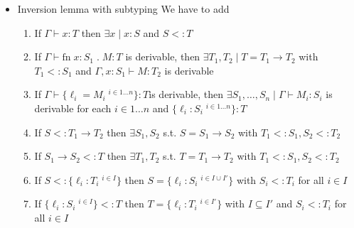 \documentclass[11pt]{article}
\newcommand{\fn}[2]{\ensuremath{\text{fn}\; #1 \; . \; #2}}
\newcommand{\type}[2]{\ensuremath{ #1 : #2 }}
\newcommand{\rec}[1]{\ensuremath{ \{ #1 \} }}
\newcommand{\subt}[2]{\ensuremath{ #1 <: #2 }}
\begin{document}
\begin{itemize}
\item Inversion lemma with subtyping
\label{sec:org315bd31}
We have to add
\begin{enumerate}
\item If \(\Gamma \vdash \type{x}{T}\) then \(\exists x \mid
        \type{x}{S}\) and \(\subt{S}{T}\)
\item If \(\Gamma\vdash\type{\fn{\type{x}{S_1}}{M}}{T}\) is
derivable, then \(\exists T_1, T_2 \mid T = T_1 \to T_2\) with
\(\subt{T_1}{S_1}\) and \(\Gamma,\type{x}{S_1}\vdash
        \type{M}{T_2}\) is derivable
\item If \(\Gamma\vdash\type{\rec{\ell_i = M_i \;^{i\in 1\dots
        n}}}{T}\)is derivable, then \(\exists S_1,\dots,S_n \mid
        \Gamma\vdash \type{M_i}{S_i}\) is derivable for each \(i\in
        1\dots n\) and \(\type{\rec{\type{\ell_i}{S_i}\;^{i\in 1 \dots
        n}}}{T}\)
\item If \(\subt{S}{T_1 \to T_2}\) then \(\exists S_1, S_2\)
s.t. \(S = S_1 \to S_2\) with \(\subt{T_1}{S_1},
        \subt{S_2}{T_2}\)
\item If \(\subt{S_1\to S_2}{T}\) then \(\exists T_1, T_2\) s.t. \(T
        = T_1 \to T_2\) with \(\subt{T_1}{S_1}, \subt{S_2}{T_2}\)
\item If \(\subt{S}{\rec{\type{\ell_i}{T_i}\;^{i\in I}}}\) then
\(S=\rec{\type{\ell_i}{S_i}\;^{i\in I \cup I'}}\) with
\(\subt{S_i}{T_i}\) for all \(i \in I\)
\item If \(\subt{\rec{\type{\ell_i}{S_i}\;^{i\in I}}}{T}\) then
\(T=\rec{\type{\ell_i}{T_i}\;^{i\in I'}}\) with \(I\subseteq
        I'\) and \(\subt{S_i}{T_i}\) for all \(i \in I\)
\end{enumerate}
\end{itemize}
\end{document}
